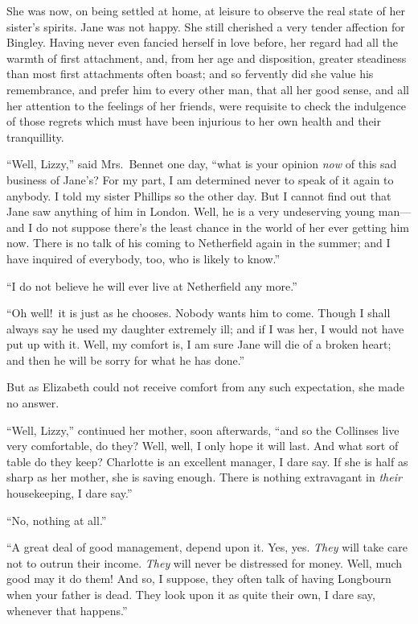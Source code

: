 \documentclass[12pt,english,oneside]{book}
\begin{document}
She was now, on being settled at home, at leisure to observe the real
state of her sister's spirits. Jane was not happy. She still cherished
a very tender affection for Bingley. Having never even fancied herself
in love before, her regard had all the warmth of first attachment,
and, from her age and disposition, greater steadiness than most first
attachments often boast; and so fervently did she value his remembrance,
and prefer him to every other man, that all her good sense, and all
her attention to the feelings of her friends, were requisite to check
the indulgence of those regrets which must have been injurious to
her own health and their tranquillity.

{}``Well, Lizzy,'' said Mrs.\ Bennet one day, {}``what is your
opinion \textit{now} of this sad business of Jane's? For my part,
I am determined never to speak of it again to anybody. I told my sister
Phillips so the other day. But I cannot find out that Jane saw anything
of him in London. Well, he is a very undeserving young man\mbox{---}and
I do not suppose there's the least chance in the world of her ever
getting him now. There is no talk of his coming to Netherfield again
in the summer; and I have inquired of everybody, too, who is likely
to know.''

{}``I do not believe he will ever live at Netherfield any more.''

{}``Oh well!\ it is just as he chooses. Nobody wants him to come.
Though I shall always say he used my daughter extremely ill; and if
I was her, I would not have put up with it. Well, my comfort is, I
am sure Jane will die of a broken heart; and then he will be sorry
for what he has done.''

But as Elizabeth could not receive comfort from any such expectation,
she made no answer.

{}``Well, Lizzy,'' continued her mother, soon afterwards, {}``and
so the Collinses live very comfortable, do they? Well, well, I only
hope it will last. And what sort of table do they keep? Charlotte
is an excellent manager, I dare say. If she is half as sharp as her
mother, she is saving enough. There is nothing extravagant in \textit{their}
housekeeping, I dare say.''

{}``No, nothing at all.''

{}``A great deal of good management, depend upon it. Yes, yes. \textit{They}
will take care not to outrun their income. \textit{They} will never
be distressed for money. Well, much good may it do them! And so, I
suppose, they often talk of having Longbourn when your father is dead.
They look upon it as quite their own, I dare say, whenever that happens.''
\end{document}
